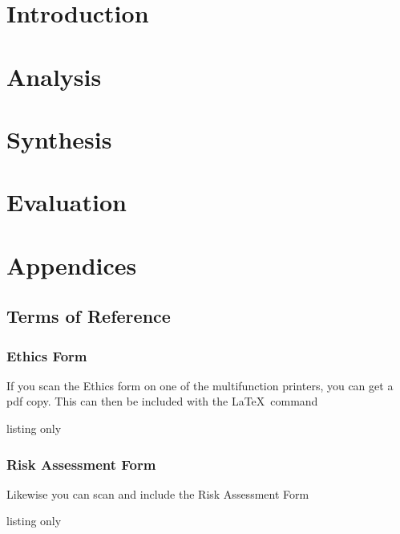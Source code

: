 \documentclass[12pt,twoside]{book}
\begin{document}
\frontmatter




\tableofcontents

\mainmatter
\part{Introduction}



\part{Analysis}


\part{Synthesis}
%

\part{Evaluation}
%




\part{Appendices}
\appendix

\chapter{Terms of Reference}

\section{Ethics Form}
If you scan the Ethics form on one of the multifunction printers, you can get a pdf copy.  This can then be included with the \LaTeX\ command
\begin{tcblisting}{listing only}
\end{tcblisting}

\section{Risk Assessment Form}
Likewise you can scan and include the Risk Assessment Form
\begin{tcblisting}{listing only}
\end{tcblisting}
\end{document}
